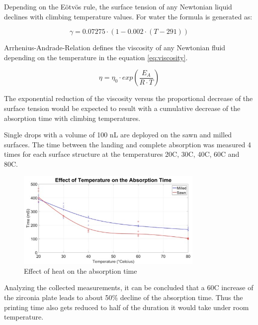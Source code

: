 Depending on the Eötvös rule, the surface tension of any Newtonian liquid declines with climbing temperature values. For water the formula is generated as:

\bigskip

\begin{equation}\label{eq:watergamma}
\gamma =0.07275 \cdotp(1-0.002\cdotp(T-291))
\end{equation}

\bigskip

Arrhenius-Andrade-Relation defines the viscosity of any Newtonian fluid depending on the temperature in the equation \ref{eq:viscosity}.  

\bigskip

\begin{equation}\label{eq:viscosity}
\eta =\eta_0 \cdotp exp(\frac{E_A}{R\cdotp T})
\end{equation}

\bigskip

The exponential reduction of the viscosity  versus the proportional decrease of the surface tension would be expected to result with a cumulative decrease of the absorption time with climbing temperatures.

Single drops with a volume of 100 nL are deployed on the sawn and milled surfaces. The time between the landing and complete absorption was measured 4 times for each surface structure at the temperatures 20\textdegree \space C, 30\textdegree \space C, 40\textdegree \space C, 60\textdegree \space C and 80\textdegree \space C.

\bigskip

\begin{figure}[H]
	\centering
	\includegraphics[width=0.8\textwidth]{grafiken/AbsorptionTime.jpg}
	\caption{Effect of heat on the absorption time}
	\label{fig:AbsorptionTime}
\end{figure} 

\bigskip

Analyzing the collected measurements, it can be concluded that a 60\textdegree \space C increase of the zirconia plate leads to about 50\% decline of the absorption time. Thus the printing time also gets reduced to half of the duration it would take under room temperature.
 
